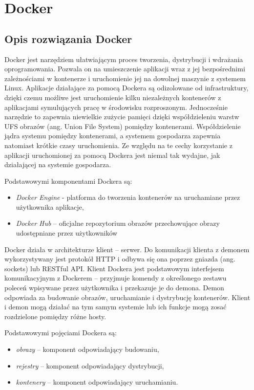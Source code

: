 \chapter{Docker}

\section{Opis rozwiązania Docker}

Docker jest narzędziem ułatwiającym proces tworzenia, dystrybucji i wdrażania oprogramowania. Pozwala on na umieszczenie aplikacji wraz z jej bezpośrednimi zależnościami w kontenerze i uruchomienie jej na dowolnej maszynie z systemem Linux. Aplikacje działające za pomocą Dockera są odizolowane od infrastruktury, dzięki czemu możliwe jest uruchomienie kilku niezależnych kontenerów z aplikacjami symulujących pracę w środowisku rozproszonym. Jednocześnie narzędzie to zapewnia niewielkie zużycie pamięci dzięki współdzieleniu warstw UFS obrazów (ang. Union File System) pomiędzy kontenerami. Współdzielenie jądra systemu pomiędzy kontenerami, a systemem gospodarza zapewnia natomiast krótkie czasy uruchomienia. Ze względu na te cechy korzystanie z aplikacji uruchomionej za pomocą Dockera jest niemal tak wydajne, jak działającej na systemie gospodarza.

	Podstawowymi komponentami Dockera są:
\begin{itemize}
\item \textit{Docker Engine} -  platforma do tworzenia kontenerów na uruchamiane przez użytkownika aplikacje,
\item \textit{Docker Hub} – oficjalne repozytorium obrazów przechowujące obrazy udostępniane przez użytkowników
\end{itemize}

	Docker działa w architekturze klient – serwer. Do komunikacji klienta z demonem wykorzystywany jest protokół HTTP i odbywa się ona poprzez gniazda (ang. sockets) lub RESTful API. Klient Dockera jest podstawowym interfejsem komunikacyjnym z Dockerem – przyjmuje komendy z określonego zestawu poleceń wpisywane przez użytkownika i przekazuje je do demona. Demon odpowiada za budowanie obrazów, uruchamianie i dystrybucję kontenerów. Klient i demon mogą działać na tym samym systemie lub ich funkcje mogą zosać rozdzielone pomiędzy różne hosty.

Podstawowymi pojęciami Dockera są:
\begin{itemize}
\item \textit{obrazy} – komponent  odpowiadający budowaniu,
\item \textit{rejestry} – komponent odpowiadający dystrybucji,
\item \textit{kontenery} – komponent odpowiadający uruchamianiu.
\end{itemize}

